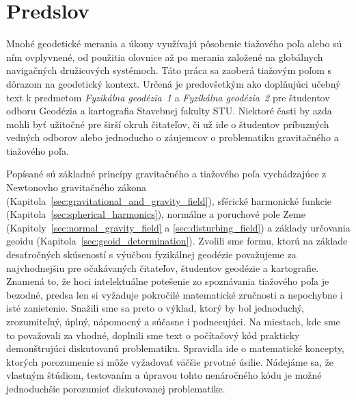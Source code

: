 \documentclass[a4paper, 12pt]{book}
\begin{document}
\tableofcontents
\newpage







\chapter*{Predslov}

Mnohé geodetické merania a úkony využívajú pôsobenie tiažového poľa alebo sú 
ním ovplyvnené, od použitia olovnice až po merania založené na globálnych 
navigačných družicových systémoch.  Táto práca sa zaoberá tiažovým poľom 
s dôrazom na geodetický kontext.  Určená je predovšetkým ako doplňujúci učebný 
text k predmetom \emph{Fyzikálna geodézia~1} a \emph{Fyzikálna geodézia~2} pre 
študentov odboru Geodézia a kartografia Stavebnej fakulty STU.  Niektoré časti 
by azda mohli byť užitočné pre širší okruh čitateľov, či už ide o študentov 
príbuzných vedných odborov alebo jednoducho o záujemcov o problematiku 
gravitačného a tiažového poľa.

Popísané sú základné princípy gravitačného a tiažového poľa vychádzajúce 
z Newtonovho gravitačného zákona 
(Kapitola~\ref{sec:gravitational_and_gravity_field}), sférické harmonické 
funkcie (Kapitola~\ref{sec:spherical_harmonics}), normálne a poruchové pole 
Zeme (Kapitoly~\ref{sec:normal_gravity_field} a \ref{sec:disturbing_field}) 
a základy určovania geoidu (Kapitola~\ref{sec:geoid_determination}).  Zvolili 
sme formu, ktorú na základe desaťročných skúseností s výučbou fyzikálnej 
geodézie považujeme za najvhodnejšiu pre očakávaných čitateľov, študentov 
geodézie a kartografie.  Znamená to, že hoci intelektuálne potešenie zo 
spoznávania tiažového poľa je bezodné, predsa len si vyžaduje pokročilé 
matematické zručnosti a nepochybne i isté zanietenie.  Snažili sme sa preto 
o výklad, ktorý by bol jednoduchý, zrozumiteľný, úplný, nápomocný a súčasne 
i podnecujúci.  Na miestach, kde sme to považovali za vhodné, doplnili sme text 
o počítačový kód prakticky demonštrujúci diskutovanú problematiku.  Spravidla 
ide o matematické koncepty, ktorých porozumenie si môže vyžadovať väčšie 
prvotné úsilie.  Nádejáme sa, že vlastným štúdiom, testovaním a úpravou tohto 
nenáročného kódu je možné jednoduchšie porozumieť diskutovanej problematike.
\end{document}
